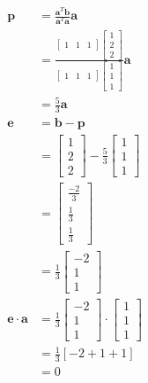 \documentclass[main.tex]{subfiles}
\begin{document}
\begin{enumerate}
\begin{enumerate}
        $$
        \begin{aligned}
        \bm{p}&=\frac{\bm{a}^{T} \bm{b}}{\bm{a}^{T} \bm{a}} \bm{a}\\
        &=\frac{\left[\begin{array}{lll}
        1 & 1 & 1
        \end{array}\right]\left[\begin{array}{l}
        1 \\
        2 \\
        2
        \end{array}\right]}{\left[\begin{array}{lll}
        1 & 1 & 1
        \end{array}\right]\left[\begin{array}{l}
        1 \\
        1 \\
        1
        \end{array}\right]}\bm{a}\\
        & = \frac{5}{3}\bm{a}\\
        \bm{e} &=\bm{b}-\bm{p} \\
        & = \left[\begin{array}{l}
        1 \\
        2 \\
        2
        \end{array}\right]-\frac{5}{3}\left[\begin{array}{l}
        1 \\
        1 \\
        1
        \end{array}\right] \\
        & = \left[\begin{array}{c}
        \frac{-2}{3} \\
        \frac{1}{3} \\
        \frac{1}{3}
        \end{array}\right] \\
        & = \frac{1}{3}\left[\begin{array}{c}
        -2 \\
        1 \\
        1
        \end{array}\right]\\
        \bm{e}\cdot \bm{a} &= \frac{1}{3}\left[\begin{array}{c}
        -2 \\
        1 \\
        1
        \end{array}\right] \cdot\left[\begin{array}{l}
        1 \\
        1 \\
        1
        \end{array}\right] \\
        &=\frac{1}{3}[-2+1+1] \\
        &=0
        \end{aligned}
        $$
        

\end{enumerate}
\end{enumerate}
\end{document}
